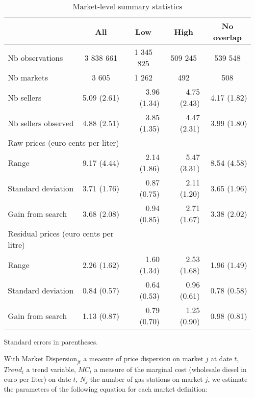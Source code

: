 \documentclass[english]{article}
\begin{document}
\begin{table}%
\caption{Market-level summary statistics}
\label{tab:stats_des_markets}
\begin{threeparttable}
\begin{tabular}{lrrrr}
    \toprule
    \toprule
          & \multicolumn{1}{c}{All} & \multicolumn{1}{c}{Low} & \multicolumn{1}{c}{High} & \multicolumn{1}{c}{No overlap} \\
    \midrule
    Nb observations & \multicolumn{1}{c}{3 838 661} & \multicolumn{1}{c}{1 345 825} & \multicolumn{1}{c}{ 509 245} & \multicolumn{1}{c}{ 539 548} \\
    Nb markets & \multicolumn{1}{c}{ 3 605} & \multicolumn{1}{c}{ 1 262} & \multicolumn{1}{c}{  492} & \multicolumn{1}{c}{  508} \\
    \midrule
    Nb sellers & 5.09 (2.61) & 3.96 (1.34) & 4.75 (2.43) & 4.17 (1.82) \\
    Nb sellers observed & 4.88 (2.51) & 3.85 (1.35) & 4.47 (2.31) & 3.99 (1.80) \\
    \midrule
    \multicolumn{2}{l}{Raw prices (euro cents per liter)} &       &       &  \\
    Range & 9.17 (4.44) & 2.14 (1.86) & 5.47 (3.31) & 8.54 (4.58) \\
    Standard deviation & 3.71 (1.76) & 0.87 (0.75) & 2.11 (1.20) & 3.65 (1.96) \\
    Gain from search & 3.68 (2.08) & 0.94 (0.85) & 2.71 (1.67) & 3.38 (2.02) \\
    \midrule
    \multicolumn{2}{l}{Residual prices (euro cents per litre)} &       &       &  \\
    Range & 2.26 (1.62) & 1.60 (1.34) & 2.53 (1.68) & 1.96 (1.49) \\
    Standard deviation & 0.84 (0.57) & 0.64 (0.53) & 0.96 (0.61) & 0.78 (0.58) \\
    Gain from search & 1.13 (0.87) & 0.79 (0.70) & 1.25 (0.90) & 0.98 (0.81) \\
\bottomrule
\bottomrule
\end{tabular}
\begin{tablenotes}
      \small
      \item Standard errors in parentheses.
\end{tablenotes}
\end{threeparttable}
\end{table}

With $\text{Market Dispersion}_{jt}$ a measure of price dispersion on market $j$ at date $t$, $Trend_t$ a trend variable, $MC_t$ a measure of the marginal cost (wholesale diesel in euro per liter) on date $t$, $N_j$ the number of gas stations on market $j$, we estimate the parameters of the following equation for each market definition:
\end{document}

